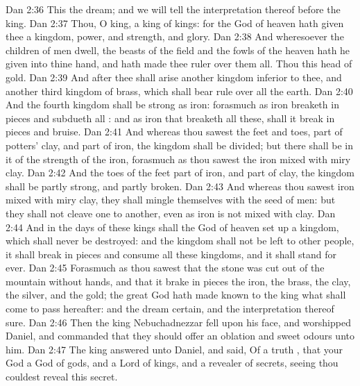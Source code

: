 \vs Dan 2:36 This  the dream; and we will tell the interpretation thereof before the king.
\vs Dan 2:37 Thou, O king,  a king of kings: for the God of heaven hath given thee a kingdom, power, and strength, and glory.
\vs Dan 2:38 And wheresoever the children of men dwell, the beasts of the field and the fowls of the heaven hath he given into thine hand, and hath made thee ruler over them all. Thou  this head of gold.
\vs Dan 2:39 And after thee shall arise another kingdom inferior to thee, and another third kingdom of brass, which shall bear rule over all the earth.
\vs Dan 2:40 And the fourth kingdom shall be strong as iron: forasmuch as iron breaketh in pieces and subdueth all : and as iron that breaketh all these, shall it break in pieces and bruise.
\vs Dan 2:41 And whereas thou sawest the feet and toes, part of potters' clay, and part of iron, the kingdom shall be divided; but there shall be in it of the strength of the iron, forasmuch as thou sawest the iron mixed with miry clay.
\vs Dan 2:42 And  the toes of the feet  part of iron, and part of clay,  the kingdom shall be partly strong, and partly broken.
\vs Dan 2:43 And whereas thou sawest iron mixed with miry clay, they shall mingle themselves with the seed of men: but they shall not cleave one to another, even as iron is not mixed with clay.
\vs Dan 2:44 And in the days of these kings shall the God of heaven set up a kingdom, which shall never be destroyed: and the kingdom shall not be left to other people,  it shall break in pieces and consume all these kingdoms, and it shall stand for ever.
\vs Dan 2:45 Forasmuch as thou sawest that the stone was cut out of the mountain without hands, and that it brake in pieces the iron, the brass, the clay, the silver, and the gold; the great God hath made known to the king what shall come to pass hereafter: and the dream  certain, and the interpretation thereof sure.
\vs Dan 2:46 Then the king Nebuchadnezzar fell upon his face, and worshipped Daniel, and commanded that they should offer an oblation and sweet odours unto him.
\vs Dan 2:47 The king answered unto Daniel, and said, Of a truth , that your God  a God of gods, and a Lord of kings, and a revealer of secrets, seeing thou couldest reveal this secret.
